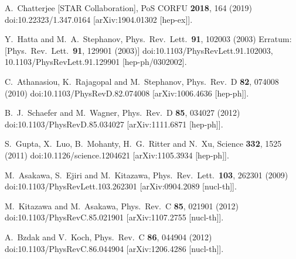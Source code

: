 \begin{thebibliography}{99}
  A.~Chatterjee [STAR Collaboration],
  PoS CORFU {\bf 2018}, 164 (2019)
  doi:10.22323/1.347.0164
  [arXiv:1904.01302 [hep-ex]].



  Y.~Hatta and M.~A.~Stephanov,
  Phys.\ Rev.\ Lett.\  {\bf 91}, 102003 (2003)
  Erratum: [Phys.\ Rev.\ Lett.\  {\bf 91}, 129901 (2003)]
  doi:10.1103/PhysRevLett.91.102003, 10.1103/PhysRevLett.91.129901
  [hep-ph/0302002].
  
  C.~Athanasiou, K.~Rajagopal and M.~Stephanov,
  Phys.\ Rev.\ D {\bf 82}, 074008 (2010)
  doi:10.1103/PhysRevD.82.074008
  [arXiv:1006.4636 [hep-ph]].
  
  B.~J.~Schaefer and M.~Wagner,
  Phys.\ Rev.\ D {\bf 85}, 034027 (2012)
  doi:10.1103/PhysRevD.85.034027
  [arXiv:1111.6871 [hep-ph]].
  
  S.~Gupta, X.~Luo, B.~Mohanty, H.~G.~Ritter and N.~Xu,
  Science {\bf 332}, 1525 (2011)
  doi:10.1126/science.1204621
  [arXiv:1105.3934 [hep-ph]].
 
  M.~Asakawa, S.~Ejiri and M.~Kitazawa,
  Phys.\ Rev.\ Lett.\  {\bf 103}, 262301 (2009)
  doi:10.1103/PhysRevLett.103.262301
  [arXiv:0904.2089 [nucl-th]].


 M.~Kitazawa and M.~Asakawa,
  Phys.\ Rev.\ C {\bf 85}, 021901 (2012)
  doi:10.1103/PhysRevC.85.021901
  [arXiv:1107.2755 [nucl-th]].

 A.~Bzdak and V.~Koch,
  Phys.\ Rev.\ C {\bf 86}, 044904 (2012)
  doi:10.1103/PhysRevC.86.044904
  [arXiv:1206.4286 [nucl-th]].


\end{thebibliography}
